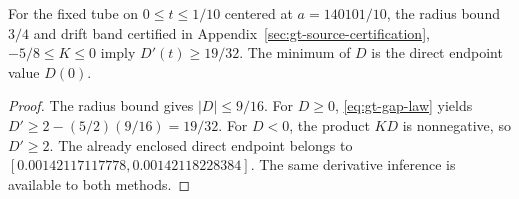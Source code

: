 \begin{proposition}
\label{prop:gt-matched-minimum}
For the fixed tube on \(0\le t\le1/10\) centered at \(a=140101/10\),
the radius bound \(3/4\) and drift band certified in
Appendix~\ref{sec:gt-source-certification},
\(-5/8\le K\le0\) imply \(D'(t)\ge19/32\). The minimum of \(D\)
is the direct endpoint value \(D(0)\).
\end{proposition}
\begin{proof}
The radius bound gives \(|D|\le9/16\).
For \(D\ge0\), \eqref{eq:gt-gap-law} yields
\(D'\ge2-(5/2)(9/16)=19/32\).
For \(D<0\), the product \(KD\) is nonnegative, so \(D'\ge2\).
The already enclosed direct endpoint belongs to
\([0.00142117117778,0.00142118228384]\). The same derivative
inference is available to both methods.
\end{proof}
